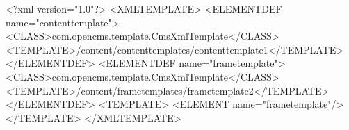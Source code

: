<?xml version="1.0"?> <XMLTEMPLATE>
    <ELEMENTDEF name="contenttemplate">
        <CLASS>com.opencms.template.CmsXmlTemplate</CLASS>
        <TEMPLATE>/content/contenttemplates/contenttemplate1</TEMPLATE>
    </ELEMENTDEF>
    <ELEMENTDEF name="frametemplate">
        <CLASS>com.opencms.template.CmsXmlTemplate</CLASS>
        <TEMPLATE>/content/frametemplates/frametemplate2</TEMPLATE>
    </ELEMENTDEF>
<TEMPLATE> <ELEMENT name="frametemplate"/> </TEMPLATE>
</XMLTEMPLATE>
